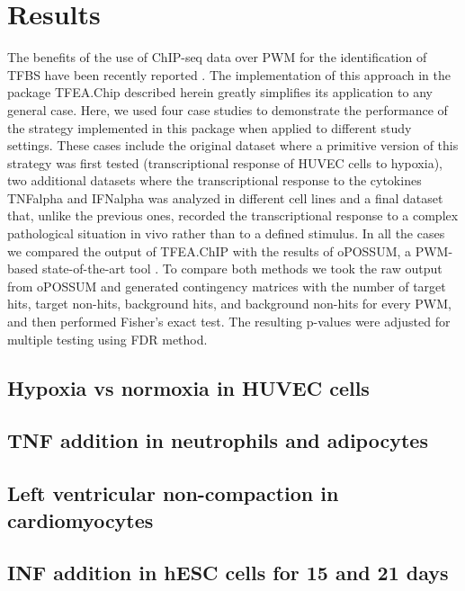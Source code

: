 \documentclass[10pt,letterpaper]{article}
\begin{document}
	\section*{Results}
	The benefits of the use of ChIP-seq data over PWM for the identification of TFBS have been recently reported \cite{Tiana2018a}. The implementation of this approach in the package TFEA.Chip described herein greatly simplifies its application to any general case. Here, we used four case studies to demonstrate the performance of the strategy implemented in this package when applied to different study settings. These cases include the original dataset where a primitive version of this strategy was first tested (transcriptional response of HUVEC cells to hypoxia), two additional datasets where the transcriptional response to the cytokines TNFalpha and IFNalpha was analyzed in different cell lines and a final dataset that, unlike the previous ones, recorded the transcriptional response to a complex pathological situation in vivo rather than to a defined stimulus. In all the cases we compared the output of TFEA.ChIP with the results of oPOSSUM, a PWM-based state-of-the-art tool \cite{Kwon2012}. To compare both methods we took the raw output from oPOSSUM and generated contingency matrices with the number of target hits, target non-hits, background hits, and background non-hits for every PWM, and then performed Fisher’s exact test. The resulting p-values were adjusted for multiple testing using FDR method.
	
	\subsection{Hypoxia vs normoxia in HUVEC cells}
	
	\subsection{TNF addition in neutrophils and adipocytes}
	
	\subsection{Left ventricular non-compaction in cardiomyocytes}
	
	\subsection{INF addition in hESC cells for 15 and 21 days}
	
\end{document}
